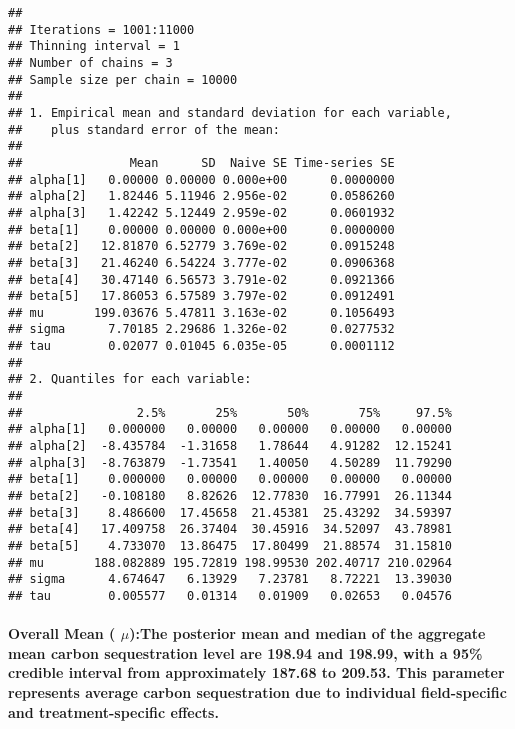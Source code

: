 \documentclass[
]{article}
\begin{document}
\begin{verbatim}
## 
## Iterations = 1001:11000
## Thinning interval = 1 
## Number of chains = 3 
## Sample size per chain = 10000 
## 
## 1. Empirical mean and standard deviation for each variable,
##    plus standard error of the mean:
## 
##               Mean      SD  Naive SE Time-series SE
## alpha[1]   0.00000 0.00000 0.000e+00      0.0000000
## alpha[2]   1.82446 5.11946 2.956e-02      0.0586260
## alpha[3]   1.42242 5.12449 2.959e-02      0.0601932
## beta[1]    0.00000 0.00000 0.000e+00      0.0000000
## beta[2]   12.81870 6.52779 3.769e-02      0.0915248
## beta[3]   21.46240 6.54224 3.777e-02      0.0906368
## beta[4]   30.47140 6.56573 3.791e-02      0.0921366
## beta[5]   17.86053 6.57589 3.797e-02      0.0912491
## mu       199.03676 5.47811 3.163e-02      0.1056493
## sigma      7.70185 2.29686 1.326e-02      0.0277532
## tau        0.02077 0.01045 6.035e-05      0.0001112
## 
## 2. Quantiles for each variable:
## 
##                2.5%       25%       50%       75%     97.5%
## alpha[1]   0.000000   0.00000   0.00000   0.00000   0.00000
## alpha[2]  -8.435784  -1.31658   1.78644   4.91282  12.15241
## alpha[3]  -8.763879  -1.73541   1.40050   4.50289  11.79290
## beta[1]    0.000000   0.00000   0.00000   0.00000   0.00000
## beta[2]   -0.108180   8.82626  12.77830  16.77991  26.11344
## beta[3]    8.486600  17.45658  21.45381  25.43292  34.59397
## beta[4]   17.409758  26.37404  30.45916  34.52097  43.78981
## beta[5]    4.733070  13.86475  17.80499  21.88574  31.15810
## mu       188.082889 195.72819 198.99530 202.40717 210.02964
## sigma      4.674647   6.13929   7.23781   8.72221  13.39030
## tau        0.005577   0.01314   0.01909   0.02653   0.04576
\end{verbatim}

\paragraph{\texorpdfstring{Overall Mean ( \(\mu\)):The posterior mean
and median of the aggregate mean carbon sequestration level are 198.94
and 198.99, with a 95\% credible interval from approximately 187.68 to
209.53. This parameter represents average carbon sequestration due to
individual field-specific and treatment-specific
effects.}{Overall Mean ( \textbackslash mu):The posterior mean and median of the aggregate mean carbon sequestration level are 198.94 and 198.99, with a 95\% credible interval from approximately 187.68 to 209.53. This parameter represents average carbon sequestration due to individual field-specific and treatment-specific effects.}}\label{overall-mean-muthe-posterior-mean-and-median-of-the-aggregate-mean-carbon-sequestration-level-are-198.94-and-198.99-with-a-95-credible-interval-from-approximately-187.68-to-209.53.-this-parameter-represents-average-carbon-sequestration-due-to-individual-field-specific-and-treatment-specific-effects.}
\end{document}
